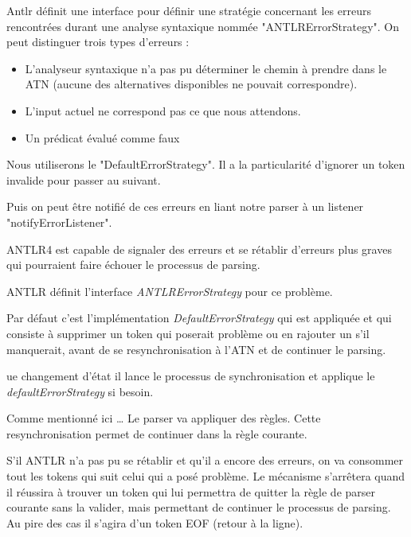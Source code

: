 \documentclass[
    iict, %
    il, %
]{heig-tb}
\begin{document}
Antlr définit une interface pour définir une stratégie concernant les erreurs rencontrées durant une analyse syntaxique nommée "ANTLRErrorStrategy".
On peut distinguer trois types d'erreurs :
\begin{itemize}
    \item L'analyseur syntaxique n'a pas pu déterminer le chemin à prendre dans le ATN (aucune des alternatives disponibles ne pouvait correspondre).
    \item L'input actuel ne correspond pas ce que nous attendons.
    \item Un prédicat évalué comme faux
\end{itemize}

Nous utiliserons le "DefaultErrorStrategy". Il a la particularité d'ignorer un token invalide pour passer au suivant.

Puis on peut être notifié de ces erreurs en liant notre parser à un listener "notifyErrorListener".




ANTLR4 est capable de signaler des erreurs et se rétablir d'erreurs plus graves qui pourraient faire échouer le processus de parsing.

ANTLR définit l'interface \emph{ANTLRErrorStrategy} pour ce problème.

Par défaut c'est l'implémentation \emph{DefaultErrorStrategy} qui est appliquée et qui consiste à supprimer un token qui poserait problème ou en rajouter un s'il manquerait, avant de
se resynchronisation à l'ATN et de continuer le parsing.

ue changement d'état  il lance le processus de synchronisation et applique le \emph{defaultErrorStrategy} si besoin.

Comme mentionné ici \dots
Le parser va appliquer des règles.
Cette resynchronisation permet de continuer dans la règle courante.

S'il ANTLR n'a pas pu se rétablir et qu'il a encore des erreurs, on va consommer tout les tokens qui suit celui qui a posé problème. 
Le mécanisme s'arrêtera quand il réussira à trouver un token qui lui permettra de quitter la règle de parser courante sans la valider, mais permettant de continuer le processus de parsing.
Au pire des cas il s'agira d'un token EOF (retour à la ligne).
\end{document}
